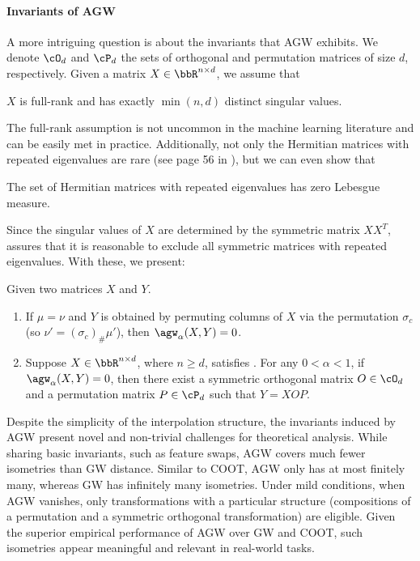 \paragraph{Invariants of AGW}
A more intriguing question is about the invariants that AGW exhibits.
We denote $\cO_d$ and $\cP_d$ the sets of orthogonal and permutation matrices of size $d$,
respectively. Given a matrix $X \in \bbR^{n \times d}$, we assume that
\begin{assumption}
    \label{assumption:1}
    $X$ is full-rank and has exactly $\min(n, d)$ distinct singular values.
\end{assumption}
The full-rank assumption is not uncommon in the machine learning literature \citep{Kenji19}
and can be easily met in practice. Additionally,
not only the Hermitian matrices with repeated eigenvalues are rare (see page 56 in \citep{Tao12}),
but we can even show that
\begin{corollary}
\label{corr:hermitian}
    The set of Hermitian matrices with repeated eigenvalues has zero Lebesgue measure.
\end{corollary}
Since the singular values of $X$ are determined by the symmetric matrix $X X^T$,
 assures that it is reasonable to exclude all symmetric matrices
with repeated eigenvalues. With these, we present:
\begin{theorem}
\label{thm:invariant}
Given two matrices $X$ and $Y$.
\begin{enumerate}
    \item If $\mu = \nu$ and $Y$ is obtained by permuting columns of
    $X$ via the permutation $\sigma_c$ (so $\nu' = (\sigma_c)_{\#} \mu'$),
    then $\agw_{\alpha}(X, Y) = 0$.
    \item Suppose $X \in \bbR^{n \times d}$, where $n \geq d$, satisfies .
    For any $0 < \alpha < 1$, if $\agw_{\alpha}(X, Y) = 0$,
    then there exist a symmetric orthogonal matrix $O \in \cO_d$ and
    a permutation matrix $P \in \cP_d$ such that $Y = X OP$.
\end{enumerate}
\end{theorem}
Despite the simplicity of the interpolation structure, the invariants induced by AGW
present novel and non-trivial challenges for theoretical analysis.
While sharing basic invariants, such as feature swaps, AGW covers much fewer isometries than
GW distance. Similar to COOT, AGW only has at most finitely many, whereas GW has infinitely many isometries.
Under mild conditions, when AGW vanishes, only transformations with a particular structure
(compositions of a permutation and a symmetric orthogonal transformation) are eligible.
Given the superior empirical performance of AGW over GW and COOT, such isometries appear
meaningful and relevant in real-world tasks.


